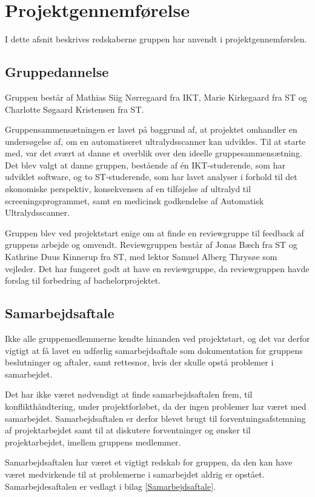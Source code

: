 \chapter{Projektgennemførelse}\label{kapitel_Projektgennemforelse}
I dette afsnit beskrives redskaberne gruppen har anvendt i projektgennemførslen. 

\section{Gruppedannelse}
Gruppen består af Mathias Siig Nørregaard fra IKT, Marie Kirkegaard fra ST og Charlotte Søgaard Kristensen fra ST. 

Gruppensammensætningen er lavet på baggrund af, at projektet omhandler en undersøgelse af, om en automatiseret ultralydsscanner kan udvikles. Til at starte med, var det svært at danne et overblik over den ideelle gruppesammensætning. Det blev valgt at danne gruppen, bestående af én IKT-studerende, som har udviklet software, og to ST-studerende, som har lavet analyser i forhold til det økonomiske perspektiv, konsekvensen af en tilføjelse af ultralyd til screeningsprogrammet, samt en medicinsk godkendelse af Automatisk Ultralydsscanner. 

Gruppen blev ved projektstart enige om at finde en reviewgruppe til feedback af gruppens arbejde og omvendt. Reviewgruppen består af Jonas Bæch fra ST og Kathrine Duus Kinnerup fra ST, med lektor Samuel Alberg Thrysøe som vejleder. Det har fungeret godt at have en reviewgruppe, da reviewgruppen havde forslag til forbedring af bachelorprojektet.  

\section{Samarbejdsaftale}
Ikke alle gruppemedlemmerne kendte hinanden ved projektstart, og det var derfor vigtigt at få lavet en udførlig samarbejdsaftale som dokumentation for gruppens beslutninger og aftaler, samt rettesnor, hvis der skulle opstå problemer i samarbejdet. 

Det har ikke været nødvendigt at finde samarbejdsaftalen frem, til konflikthåndtering, under projektforløbet, da der ingen problemer har været med samarbejdet. Samarbejdsaftalen er derfor blevet brugt til forventningsafstemning af projektarbejdet samt til at diskutere forventninger og ønsker til projektarbejdet, imellem gruppens medlemmer. 

Samarbejdsaftalen har været et vigtigt redskab for gruppen, da den kan have været medvirkende til at problemerne i samarbejdet aldrig er opstået. Samarbejdesaftalen er vedlagt i bilag \ref{Samarbejdsaftale}. 

